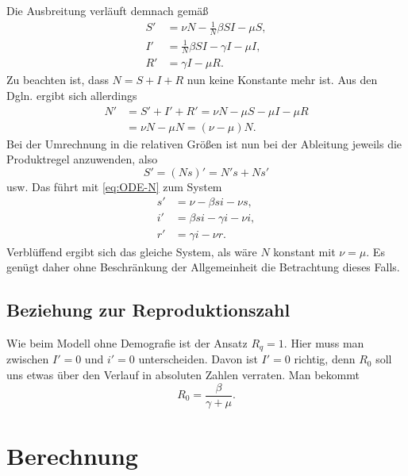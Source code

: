 \documentclass[a4paper,10pt,fleqn,twocolumn,twoside,dvipdfmx]{scrartcl}
\numberwithin{equation}{section}
\begin{document}
Die Ausbreitung verläuft demnach gemäß%
\begin{align}
S' &= \nu N - \tfrac{1}{N}\beta SI - \mu S,\\
I' &= \tfrac{1}{N}\beta SI - \gamma I - \mu I,\\
R' &= \gamma I - \mu R.
\end{align}
Zu beachten ist, dass $N=S+I+R$ nun keine Konstante mehr
ist. Aus den Dgln. ergibt sich allerdings
\begin{equation}\label{eq:ODE-N}
\begin{split}
N' &= S'+I'+R' = \nu N - \mu S - \mu I - \mu R\\
&= \nu N - \mu N = (\nu-\mu)N.
\end{split}
\end{equation}
Bei der Umrechnung in die relativen Größen ist nun bei der
Ableitung jeweils die Produktregel anzuwenden, also
\[S' = (Ns)' = N's + Ns'\]
usw. Das führt mit \eqref{eq:ODE-N} zum System
\begin{align}
s' &= \nu - \beta si - \nu s,\\
i' &= \beta si - \gamma i - \nu i,\\
r' &= \gamma i - \nu r.
\end{align}
Verblüffend ergibt sich das gleiche System, als wäre
$N$ konstant mit $\nu = \mu$. Es genügt daher ohne Beschränkung
der Allgemeinheit die Betrachtung dieses Falls.

\subsection{Beziehung zur Reproduktionszahl}

Wie beim Modell ohne Demografie ist der Ansatz $R_q = 1$.
Hier muss man zwischen $I'=0$ und $i'=0$ unterscheiden. Davon ist
$I'=0$ richtig, denn $R_0$ soll uns etwas über den Verlauf in
absoluten Zahlen verraten. Man bekommt
\begin{equation}
R_0 = \frac{\beta}{\gamma+\mu}.
\end{equation}

\newpage
\section{Berechnung}
\end{document}
